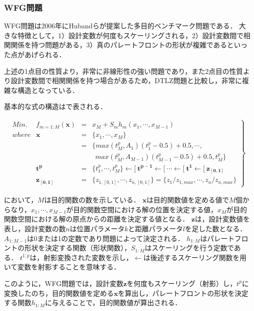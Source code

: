 \documentclass[../main/main]{subfiles}
\begin{document}
\subsubsection{WFG問題}
WFG問題\cite{Huband2006AReview}は2006年にHubandらが提案した多目的ベンチマーク問題である．
大きな特徴として，1）設計変数が何度もスケーリングされる，2）設計変数間で相関関係を持つ問題がある，3）真のパレートフロントの形状が複雑であるといった点があげられる．

上述の1点目の性質より，非常に非線形性の強い問題であり，また2点目の性質より設計変数間で相関関係を持つ場合があるため，DTLZ問題と比較し，非常に複雑な構造となっている．

基本的な式の構造はで表される．

\begin{eqnarray} 
\left.
\begin{array}{rccl}
Min. & f_{m = 1:M}  (\bm{x}) &=& x_M + S_m h_m (x_1, \cdots, x_{M-1})\\
where & \bm{x} &=& \{x_1, \cdots, x_M\} \\
&&=& \{ max(t^p_M,A_1)(t^p_1 - 0.5) + 0.5, \cdots, \\
& & & \ \ max(t^p_M,A_{M-1})(t^p_{M-1} - 0.5)+0.5, t^p_M\} \\
& \bm{t^p} &=& \{t^p_1, \cdots, t^p_M \} \longleftarrow [ \ \bm{t^{p-1}} \longleftarrow [ \ \cdots \longleftarrow [ \ \bm{t^1} \longleftarrow [ \ \bm{z_{[0,1]}}\\
&  \bm{z_{[0,1]}} &=& \{ z_{1,[0,1]}, \cdots, z_{n,[0,1]} \} = \{ z_1 / z_{1,max}, \cdots, z_n / z_{n,max} \}
   \label{wfg_standard} 
\end{array}
\right\}
\end{eqnarray}

において，$M$は目的関数の数を示している．
$\bm{x}$は目的関数値を定める値で$M$個からなり，$x_1, \cdots, x_{M-1}$が目的関数空間における解の位置を決定する値，$x_M$が目的関数空間における解の原点からの距離を決定する値となる．
$\bm{z}$は，設計変数値を表し，設計変数の数$n$は位置パラメータ$k$と距離パラメータ$l$を足した数となる．
$A_{1:M-1}$は0または1の定数であり問題によって決定される．
$h_{1:M}$はパレートフロントの形状を決定する関数（形状関数），$S_{1:M}$はスケーリングを行う定数である．
$t^{1:p}$は，射影変換された変数を示し，$\longleftarrow$は後述するスケーリング関数を用いて変数を射影することを意味する．

このように，WFG問題では，設計変数$\bm{z}$を何度もスケーリング（射影）し，$t^p$に変換したのち，目的関数値を定める$\bm{x}$を算出し，パレートフロントの形状を決定する関数$h_{1:M}$に与えることで，目的関数値が算出される．
\end{document}
